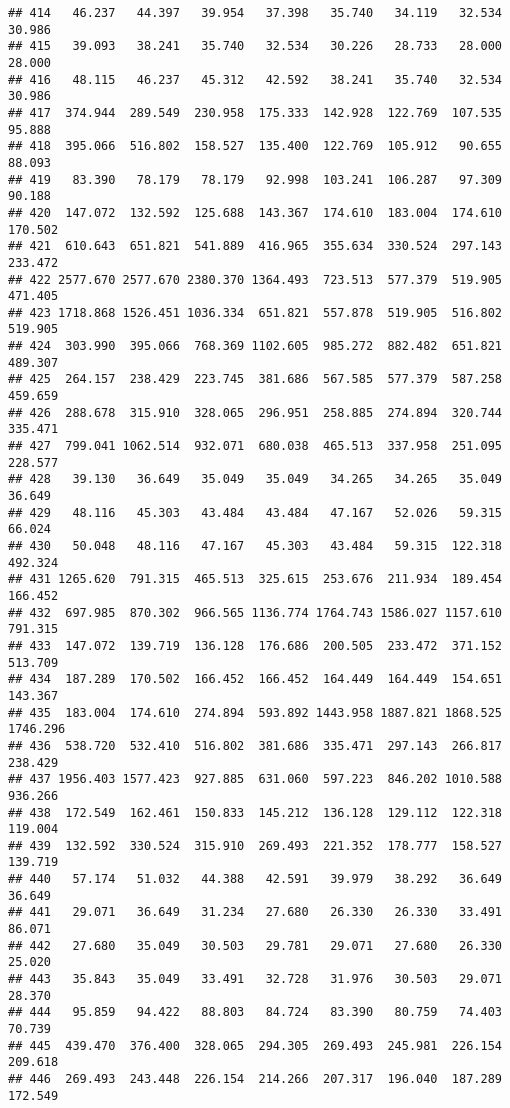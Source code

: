\documentclass[
]{article}
\begin{document}
\begin{verbatim}
## 414   46.237   44.397   39.954   37.398   35.740   34.119   32.534   30.986
## 415   39.093   38.241   35.740   32.534   30.226   28.733   28.000   28.000
## 416   48.115   46.237   45.312   42.592   38.241   35.740   32.534   30.986
## 417  374.944  289.549  230.958  175.333  142.928  122.769  107.535   95.888
## 418  395.066  516.802  158.527  135.400  122.769  105.912   90.655   88.093
## 419   83.390   78.179   78.179   92.998  103.241  106.287   97.309   90.188
## 420  147.072  132.592  125.688  143.367  174.610  183.004  174.610  170.502
## 421  610.643  651.821  541.889  416.965  355.634  330.524  297.143  233.472
## 422 2577.670 2577.670 2380.370 1364.493  723.513  577.379  519.905  471.405
## 423 1718.868 1526.451 1036.334  651.821  557.878  519.905  516.802  519.905
## 424  303.990  395.066  768.369 1102.605  985.272  882.482  651.821  489.307
## 425  264.157  238.429  223.745  381.686  567.585  577.379  587.258  459.659
## 426  288.678  315.910  328.065  296.951  258.885  274.894  320.744  335.471
## 427  799.041 1062.514  932.071  680.038  465.513  337.958  251.095  228.577
## 428   39.130   36.649   35.049   35.049   34.265   34.265   35.049   36.649
## 429   48.116   45.303   43.484   43.484   47.167   52.026   59.315   66.024
## 430   50.048   48.116   47.167   45.303   43.484   59.315  122.318  492.324
## 431 1265.620  791.315  465.513  325.615  253.676  211.934  189.454  166.452
## 432  697.985  870.302  966.565 1136.774 1764.743 1586.027 1157.610  791.315
## 433  147.072  139.719  136.128  176.686  200.505  233.472  371.152  513.709
## 434  187.289  170.502  166.452  166.452  164.449  164.449  154.651  143.367
## 435  183.004  174.610  274.894  593.892 1443.958 1887.821 1868.525 1746.296
## 436  538.720  532.410  516.802  381.686  335.471  297.143  266.817  238.429
## 437 1956.403 1577.423  927.885  631.060  597.223  846.202 1010.588  936.266
## 438  172.549  162.461  150.833  145.212  136.128  129.112  122.318  119.004
## 439  132.592  330.524  315.910  269.493  221.352  178.777  158.527  139.719
## 440   57.174   51.032   44.388   42.591   39.979   38.292   36.649   36.649
## 441   29.071   36.649   31.234   27.680   26.330   26.330   33.491   86.071
## 442   27.680   35.049   30.503   29.781   29.071   27.680   26.330   25.020
## 443   35.843   35.049   33.491   32.728   31.976   30.503   29.071   28.370
## 444   95.859   94.422   88.803   84.724   83.390   80.759   74.403   70.739
## 445  439.470  376.400  328.065  294.305  269.493  245.981  226.154  209.618
## 446  269.493  243.448  226.154  214.266  207.317  196.040  187.289  172.549

\end{verbatim}
\end{document}
